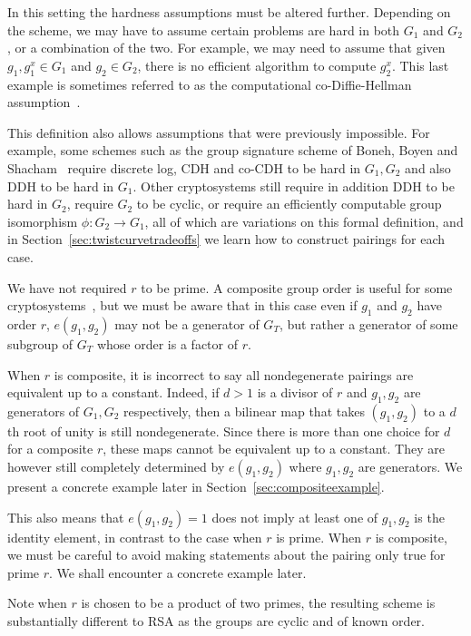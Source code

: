 In this setting the hardness assumptions must be altered further. Depending on
the scheme, we may have to assume certain problems are hard in both $G_1$ and
$G_2$, or a combination of the two. For example, we may need to assume that
given $g_1, g_1^x \in G_1$ and $g_2 \in G_2$, there is no efficient algorithm
to compute $g_2^x$. This last example is sometimes referred to as the
computational co-Diffie-Hellman assumption~\cite{bls}.

This definition also allows assumptions that were previously impossible. For
example, some schemes such as the group signature scheme of Boneh, Boyen and
Shacham~\cite{bbs} require discrete log, CDH and co-CDH to be hard in $G_1,
G_2$ and also DDH to be hard in $G_1$. Other cryptosystems still require in
addition DDH to be hard in $G_2$, require $G_2$ to be cyclic, or require an
efficiently computable group isomorphism $\phi:G_2 \rightarrow G_1$, all of
which are variations on this formal definition, and in
Section~\ref{sec:twistcurvetradeoffs} we learn how to construct pairings for
each case.

We have not required $r$ to be prime. A composite group order is useful for
some cryptosystems~\cite{bgn}, but we must be aware that in this case even if
$g_1$ and $g_2$ have order $r$, $e(g_1, g_2)$ may not be a generator of $G_T$,
but rather a generator of some subgroup of $G_T$ whose order is a factor of
$r$.

When $r$ is composite, it is incorrect to say all nondegenerate pairings are
equivalent up to a constant. Indeed, if $d > 1$ is a divisor of $r$
and $g_1, g_2$ are generators of $G_1, G_2$ respectively, then a bilinear map
that takes $(g_1, g_2)$ to a $d$th root of unity is still nondegenerate.
Since there is more than one choice for $d$ for a composite $r$,
these maps cannot be equivalent up to a constant. They are however still
completely determined by $e(g_1, g_2)$ where $g_1, g_2$ are generators.
We present a concrete example later in Section~\ref{sec:compositeexample}.

This also means that $e(g_1, g_2) = 1$ does not imply at least
one of $g_1, g_2$ is the identity element, in contrast to the case when
$r$ is prime. When $r$ is composite, we must be careful to avoid
making statements about the pairing only true for prime $r$.
We shall encounter a concrete example later.

Note when $r$ is chosen to be a product of two primes, the resulting scheme
is substantially different to RSA as the groups are cyclic and of
known order.

